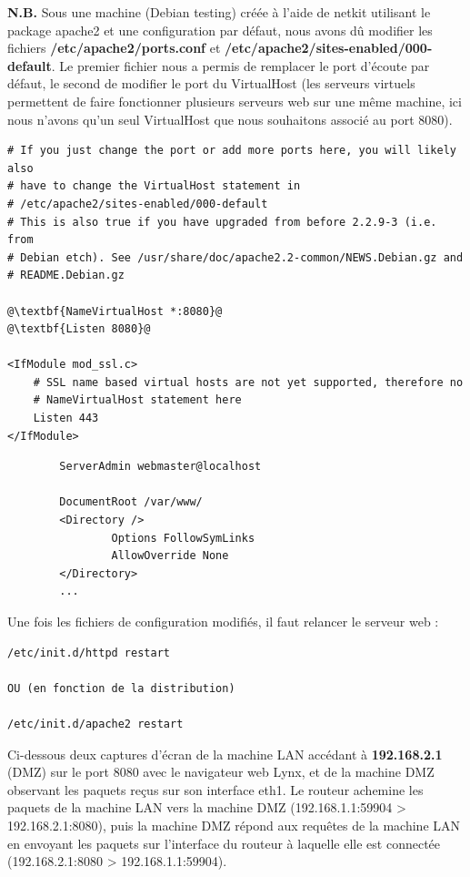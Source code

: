 \documentclass[frenchb, 11pt]{article}
\begin{document}
\noindent \textbf{N.B.} Sous une machine (Debian testing) créée à l'aide de netkit utilisant le package apache2 et une configuration par défaut, nous avons dû modifier les fichiers \textbf{/etc/apache2/ports.conf} et \textbf{/etc/apache2/sites-enabled/000-default}. Le premier fichier nous a permis de remplacer le port d'écoute par défaut, le second de modifier le port du VirtualHost (les serveurs virtuels permettent de faire fonctionner plusieurs serveurs web sur une même machine, ici nous n'avons qu'un seul VirtualHost que nous souhaitons associé au port 8080).

\begin{lstlisting}[caption=/etc/apache2/ports.conf, escapechar=@]
# If you just change the port or add more ports here, you will likely also
# have to change the VirtualHost statement in
# /etc/apache2/sites-enabled/000-default
# This is also true if you have upgraded from before 2.2.9-3 (i.e. from
# Debian etch). See /usr/share/doc/apache2.2-common/NEWS.Debian.gz and
# README.Debian.gz

@\textbf{NameVirtualHost *:8080}@
@\textbf{Listen 8080}@

<IfModule mod_ssl.c>
    # SSL name based virtual hosts are not yet supported, therefore no
    # NameVirtualHost statement here
    Listen 443
</IfModule>
\end{lstlisting}

\begin{lstlisting}[caption=/etc/apache2/sites-enabled/000-default, escapechar=\%]
%\textbf{<VirtualHost *:8080>}%
        ServerAdmin webmaster@localhost

        DocumentRoot /var/www/
        <Directory />
                Options FollowSymLinks
                AllowOverride None
        </Directory>
		...
\end{lstlisting}

\noindent Une fois les fichiers de configuration modifiés, il faut relancer le serveur web :
\begin{lstlisting}
/etc/init.d/httpd restart

OU (en fonction de la distribution)

/etc/init.d/apache2 restart
\end{lstlisting}
\hfill

Ci-dessous deux captures d'écran de la machine LAN accédant à \textbf{192.168.2.1} (DMZ) sur le port 8080 avec le navigateur web Lynx, et de la machine DMZ observant les paquets reçus sur son interface eth1. Le routeur achemine les paquets de la machine LAN vers la machine DMZ (192.168.1.1:59904 > 192.168.2.1:8080), puis la machine DMZ répond aux requêtes de la machine LAN en envoyant les paquets sur l'interface du routeur à laquelle elle est connectée (192.168.2.1:8080 > 192.168.1.1:59904).
\end{document}
